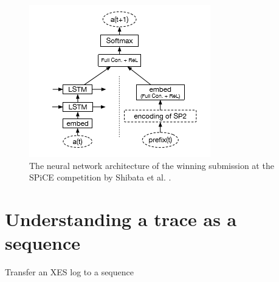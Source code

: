 \begin{figure}
    \centering
    \includegraphics[height=.5\textwidth]{gfx/spice-winner-architecture.png}
    \caption{The neural network architecture of the winning submission at the SPiCE competition by Shibata et al. \cite{shibata2016bipartite}.}
    \label{fig:spice-winner-architecture}
\end{figure}

\section{Understanding a trace as a sequence}
Transfer an XES log to a sequence